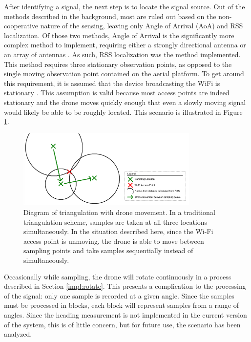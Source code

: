 After identifying a signal, the next step is to locate the signal source. Out of the methods described in the background, most are ruled out based on the non-cooperative nature of the sensing, leaving only Angle of Arrival (AoA) and RSS localization. Of those two methods, Angle of Arrival is the significantly more complex method to implement, requiring either a strongly directional antenna or an array of antennas \cite{local_aoa}. As such, RSS localization was the method implemented. This method requires three stationary observation points, as opposed to the single moving observation point contained on the aerial platform. To get around this requirement, it is assumed that the device broadcasting the WiFi is stationary \cite{rss_calc}. This assumption is valid because most access points are indeed stationary and the drone moves quickly enough that even a slowly moving signal would likely be able to be roughly located. This scenario is illustrated in Figure \ref{fig:drone_triang}. \par
\begin{figure}[ht!]
	\centering
	\includegraphics[width=0.80\textwidth]{img/drone_rss_triang}
	\caption{Diagram of triangulation with drone movement. In a traditional triangulation scheme, samples are taken at all three locations simultaneously. In the situation described here, since the Wi-Fi access point is unmoving, the drone is able to move between sampling points and take samples sequentially instead of simultaneously.}
	\label{fig:drone_triang}
\end{figure}\par
Occasionally while sampling, the drone will rotate continuously in a process described in Section \ref{impl:rotate}. This presents a complication to the processing of the signal: only one sample is recorded at a given angle. Since the samples must be processed in blocks, each block will represent samples from a range of angles. Since the heading measurement is not implemented in the current version of the system, this is of little concern, but for future use, the scenario has been analyzed. \par
